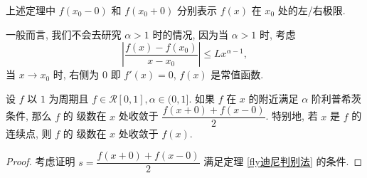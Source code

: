 \begin{remark*}
	上述定理中 $f(x_0-0)$ 和 $f(x_0+0)$ 分别表示 $f(x)$ 在 $x_0$ 处的左/右极限.
\end{remark*}

\begin{remark}
	一般而言, 我们不会去研究 $\alpha>1$ 时的情况, 因为当 $\alpha>1$ 时, 考虑 $$\left|\dfrac{f(x)-f(x_0)}{x-x_0}\right|\leqslant L x^{\alpha-1},$$ 当 $x\to x_0$ 时, 右侧为 $0$ 即 $f'(x)=0$, $f(x)$ 是常值函数.
\end{remark}

\begin{corollary}
	设 $f$ 以 $1$ 为周期且 $f\in\mathscr R[0,1],\alpha\in(0,1]$. 如果 $f$ 在 $x$ 的附近满足 $\alpha$ 阶利普希茨条件, 那么 $f$ 的 \fly 级数在 $x$ 处收敛于 $\dfrac{f(x+0)+f(x-0)}{2}$. 特别地, 若 $x$ 是 $f$ 的连续点, 则 $f$ 的 \fly 级数在 $x$ 处收敛于 $f(x)$.
\end{corollary}

\begin{proof}
	考虑证明 $s=\dfrac{f(x+0)+f(x-0)}{2}$ 满足定理 \ref{fly迪尼判别法} 的条件.
\end{proof}



